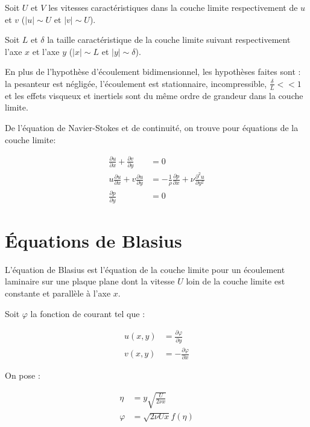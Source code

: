 Soit $U$ et $V$ les vitesses caractéristiques dans la couche limite respectivement de $u$ et $v$ ($\left| u \right| \sim U$ et $\left| v \right| \sim U$).

Soit $L$ et $\delta$ la taille caractéristique de la couche limite suivant respectivement l'axe $x$ et l'axe $y$ ($\left| x \right| \sim L$ et $\left| y \right| \sim \delta$).

En plus de l'hypothèse d'écoulement bidimensionnel, les hypothèses faites sont : la pesanteur est négligée, l'écoulement est stationnaire, incompressible, $\frac{\delta}{L} << 1$ et les effets visqueux et inertiels sont du même ordre de grandeur dans la couche limite.


De l'équation de Navier-Stokes et de continuité, on trouve pour équations de la couche limite:

\begin{align}	
	\frac{\partial u}{\partial x} 
	+
	\frac{\partial v}{\partial y} 
	&= 0 \\
	u\frac{\partial u}{\partial x} + 
	v\frac{\partial u}{\partial y} 
	&= - \frac{1}{\rho}
	\frac{\partial p}{\partial  x} +
	\nu
	\frac{\partial^{2} u}{\partial  y^{2}} \\
	\frac{\partial p}{\partial y} 
	&= 0
\end{align}
\section{Équations de Blasius}
L'équation de Blasius est l'équation de la couche limite pour un écoulement laminaire sur une plaque plane dont la vitesse $U$ loin de la couche limite est constante et parallèle à l'axe $x$.

Soit $\varphi$ la fonction de courant tel que :

\begin{align*}
	u(x,y) &= 
	\frac{\partial \varphi}{\partial y} \\
	v(x,y) &= - 
	\frac{\partial \varphi}{\partial x}
\end{align*}

On pose :

\begin{align*}
	\eta &= y \sqrt{\frac{U}{2\nu x }} \\
	\varphi &= \sqrt{2\nu U x} f(\eta)
\end{align*}


